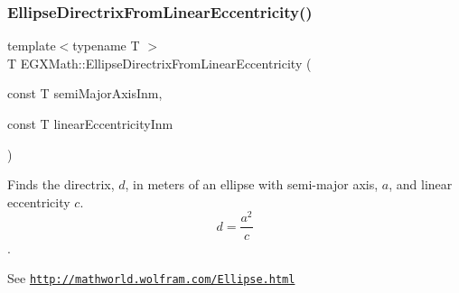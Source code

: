\subsubsection{\texorpdfstring{Ellipse\+Directrix\+From\+Linear\+Eccentricity()}{EllipseDirectrixFromLinearEccentricity()}}
{\footnotesize\ttfamily template$<$typename T $>$ \\
T E\+G\+X\+Math\+::\+Ellipse\+Directrix\+From\+Linear\+Eccentricity (\begin{DoxyParamCaption}\item[{const T}]{semi\+Major\+Axis\+Inm,  }\item[{const T}]{linear\+Eccentricity\+Inm }\end{DoxyParamCaption})}



Finds the directrix, $d$, in meters of an ellipse with semi-\/major axis, $a$, and linear eccentricity $c$. \[ d=\frac{a^2}{c} \]. 

See \href{http://mathworld.wolfram.com/Ellipse.html}{\tt http\+://mathworld.\+wolfram.\+com/\+Ellipse.\+html}


